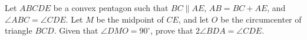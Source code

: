Let $ABCDE$ be a convex pentagon such that $BC \parallel AE$, $AB = BC + AE$, and $\angle ABC = \angle CDE$. Let $M$ be the midpoint of $CE$, and let $O$ be the circumcenter of triangle $BCD$. Given that $\angle DMO = 90^\circ$, prove that $2\angle BDA = \angle CDE$.
